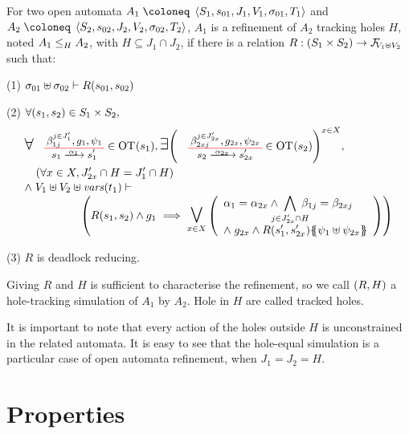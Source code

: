 \documentclass[runningheads]{llncs}
\begin{document}
\begin{definition}\label{Def:OA-Refinement}
For two open automata \(A_1 \defobject \OA{S_1}{s_{01}}{J_1}{V_1}{\sigma_{01}}{T_1}\) and \(A_2 \defobject \OA{S_2}{s_{02}}{J_2}{V_2}{\sigma_{02}}{T_2}\), \(A_1\) is a refinement of \(A_2\) tracking holes \(H\), noted \(\wrel{A_1}{A_2}{H}\), with \(H \subseteq J_1 \cap J_2\), if there is a relation $R: \mpar{S_1 \times S_2} \to \rformulas[V_1 \uplus V_2]$ such that:
\item[(1)] \(\sigma_{01} \uplus \sigma_{02} \vdash R\mpar{s_{01}, s_{02}}\)
\item[(2)] \(\forall \mpar{s_1, s_2} \in S_1 \times S_2,\)
\begin{multline*}
	\everymath{\displaystyle}\begin{array}{l}
		\bigsymb{\forall} \OTx{1}{}{1}{1} \in \fOT{s_1}, \bigsymb{\exists} \mpar{\OTx{2}{x}{2x}{2x} \in \fOT{s_2}}^{x \in X}, \\[12pt]
		\quad \mpar{\forall x \in X, J'_{2x} \cap H = J'_1 \cap H} \\[1pt]
		\nwedge V_1 \uplus V_2 \uplus \fvars{t_1} \vdash\\\hspace{5em} \mpar{R\mpar{s_1, s_2} \wedge g_1 \implies \operatorname*{\bigsymb{\bigvee}}_{x \in X} \mpar{\begin{array}{l}
			\alpha_1 = \alpha_{2x} \wedge \bigwedge_\subbox{j \in J'_{2x} \cap H} \beta_{1j} = \beta_{2xj} \\
			\nwedge g_{2x} \wedge R\mpar{s'_1, s'_{2x}}\psubst{\psi_1 \uplus \psi_{2x}}
		\end{array}}} 
	\end{array} 
\end{multline*}
\item[(3)] $R$ is deadlock reducing.

Giving \(R\) and \(H\) is sufficient to characterise the refinement, so we call \(\mpar{R, H}\) a hole-tracking simulation of \(A_1\) by \(A_2\).
Hole in \(H\) are called tracked holes.
\end{definition}
It is important to note that every action of the holes outside \(H\) is unconstrained in the related automata.
It is easy to see that the hole-equal simulation is a particular case of open automata refinement, when  $J_1=J_2=H$.



\section{Properties}\label{sec:prop}
\end{document}
